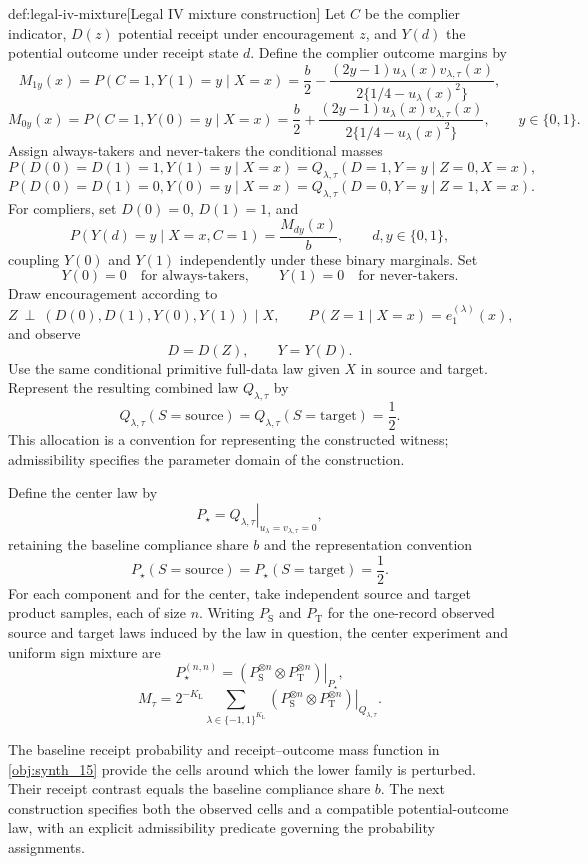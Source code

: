 \documentclass[11pt]{article}
\begin{document}
\begin{algorithmv}{def:legal-iv-mixture}[Legal IV mixture construction]
Let \(C\) be the complier indicator, \(D(z)\) potential receipt under encouragement \(z\), and \(Y(d)\) the potential outcome under receipt state \(d\). Define the complier outcome margins by
\[
M_{1y}(x)
=
P(C=1,Y(1)=y\mid X=x)
=
\frac b2
-
\frac{(2y-1)u_{\lambda}(x)v_{\lambda,\tau}(x)}
{2\{1/4-u_{\lambda}(x)^2\}},
\]
\[
M_{0y}(x)
=
P(C=1,Y(0)=y\mid X=x)
=
\frac b2
+
\frac{(2y-1)u_{\lambda}(x)v_{\lambda,\tau}(x)}
{2\{1/4-u_{\lambda}(x)^2\}},
\qquad y\in\{0,1\}.
\]
Assign always-takers and never-takers the conditional masses
\[
P(D(0)=D(1)=1,Y(1)=y\mid X=x)
=
Q_{\lambda,\tau}(D=1,Y=y\mid Z=0,X=x),
\]
\[
P(D(0)=D(1)=0,Y(0)=y\mid X=x)
=
Q_{\lambda,\tau}(D=0,Y=y\mid Z=1,X=x).
\]
For compliers, set \(D(0)=0\), \(D(1)=1\), and
\[
P(Y(d)=y\mid X=x,C=1)
=
\frac{M_{dy}(x)}b,
\qquad d,y\in\{0,1\},
\]
coupling \(Y(0)\) and \(Y(1)\) independently under these binary marginals. Set
\[
Y(0)=0\quad\text{for always-takers},
\qquad
Y(1)=0\quad\text{for never-takers}.
\]
Draw encouragement according to
\[
Z\ \perp\ (D(0),D(1),Y(0),Y(1))\mid X,
\qquad
P(Z=1\mid X=x)=e_1^{(\lambda)}(x),
\]
and observe
\[
D=D(Z),
\qquad
Y=Y(D).
\]
Use the same conditional primitive full-data law given \(X\) in source and target. Represent the resulting combined law \(Q_{\lambda,\tau}\) by
\[
Q_{\lambda,\tau}(S=\mathrm{source})
=
Q_{\lambda,\tau}(S=\mathrm{target})
=
\frac12.
\]
This allocation is a convention for representing the constructed witness; admissibility specifies the parameter domain of the construction.

Define the center law by
\[
P_{\star}
=
\left.Q_{\lambda,\tau}\right|_{u_{\lambda}=v_{\lambda,\tau}=0},
\]
retaining the baseline compliance share \(b\) and the representation convention
\[
P_{\star}(S=\mathrm{source})
=
P_{\star}(S=\mathrm{target})
=
\frac12.
\]
For each component and for the center, take independent source and target product samples, each of size \(n\). Writing \(P_{\mathrm S}\) and \(P_{\mathrm T}\) for the one-record observed source and target laws induced by the law in question, the center experiment and uniform sign mixture are
\[
P_{\star}^{(n,n)}
=
\left.
\left(P_{\mathrm S}^{\otimes n}\otimes P_{\mathrm T}^{\otimes n}\right)
\right|_{P_{\star}},
\]
\[
M_{\tau}
=
2^{-K_{\mathrm L}}
\sum_{\lambda\in\{-1,1\}^{K_{\mathrm L}}}
\left.
\left(P_{\mathrm S}^{\otimes n}\otimes P_{\mathrm T}^{\otimes n}\right)
\right|_{Q_{\lambda,\tau}}.
\]
\end{algorithmv}

The baseline receipt probability  and receipt--outcome mass function  in \cref{obj:synth_15} provide the cells around which the lower family is perturbed. Their receipt contrast equals the baseline compliance share \(b\). The next construction specifies both the observed cells and a compatible potential-outcome law, with an explicit admissibility predicate governing the probability assignments.
\end{document}
